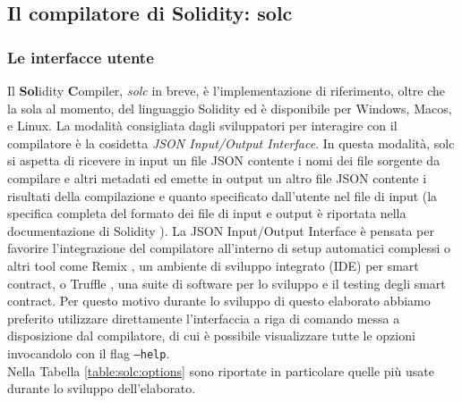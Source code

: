\documentclass[12pt,a4paper,openright,oneside]{report}
\theoremstyle{definition}
\begin{document}
\subsection{Il compilatore di Solidity: solc}\label{impl:ov:solc}
\subsubsection{Le interfacce utente}\label{impl:ov:solc:interface}
Il \textbf{Sol}idity \textbf{C}ompiler\cite{solc}, \textit{solc} in breve, \`{e} l'implementazione di riferimento, oltre che la sola al momento, del linguaggio Solidity ed \`{e} disponibile per Windows, Macos, e Linux. La modalit\`{a} consigliata dagli sviluppatori per interagire con il compilatore \`{e} la cosidetta \textit{JSON Input/Output Interface}. In questa modalit\`{a}, solc si aspetta di ricevere in input un file JSON contente i nomi dei file sorgente da compilare e altri metadati ed emette in output un altro file JSON contente i risultati della compilazione e quanto specificato dall'utente nel file di input (la specifica completa del formato dei file di input e output \`{e} riportata nella documentazione di Solidity \cite{solidity_docs}). La JSON Input/Output Interface \`{e} pensata per favorire l'integrazione del compilatore all'interno di setup automatici complessi o altri tool come Remix \cite{remix}, un ambiente di sviluppo integrato (IDE) per smart contract, o Truffle \cite{truffle}, una suite di software per lo sviluppo e il testing degli smart contract. Per questo motivo durante lo sviluppo di questo elaborato abbiamo preferito utilizzare direttamente l'interfaccia a riga di comando messa a disposizione dal compilatore, di cui \`{e} possibile visualizzare tutte le opzioni invocandolo con il flag \texttt{--help}.\\
Nella Tabella \ref{table:solc:options} sono riportate in particolare quelle pi\`{u} usate durante lo sviluppo dell'elaborato.
\end{document}
